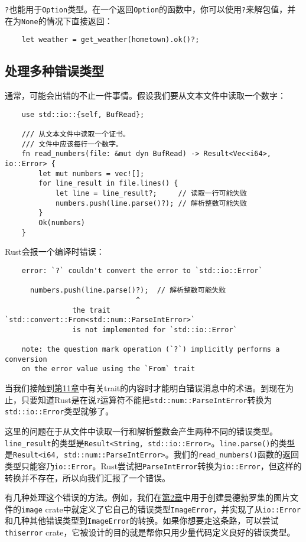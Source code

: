 \texttt{?}也能用于\texttt{Option}类型。在一个返回\texttt{Option}的函数中，你可以使用\texttt{?}来解包值，并在为\texttt{None}的情况下直接返回：
\begin{verbatim}
    let weather = get_weather(hometown).ok()?;
\end{verbatim}

\subsection{处理多种错误类型}
通常，可能会出错的不止一件事情。假设我们要从文本文件中读取一个数字：
\begin{verbatim}
    use std::io::{self, BufRead};

    /// 从文本文件中读取一个证书。
    /// 文件中应该每行一个数字。
    fn read_numbers(file: &mut dyn BufRead) -> Result<Vec<i64>, io::Error> {
        let mut numbers = vec![];
        for line_result in file.lines() {
            let line = line_result?;     // 读取一行可能失败
            numbers.push(line.parse()?); // 解析整数可能失败
        }
        Ok(numbers)
    }
\end{verbatim}

Rust会报一个编译时错误：
\begin{verbatim}
    error: `?` couldn't convert the error to `std::io::Error`

      numbers.push(line.parse()?);  // 解析整数可能失败
                               ^
                the trait `std::convert::From<std::num::ParseIntError>`
                is not implemented for `std::io::Error`

    note: the question mark operation (`?`) implicitly performs a conversion
    on the error value using the `From` trait
\end{verbatim}

当我们接触到\hyperref[ch11]{第11章}中有关trait的内容时才能明白错误消息中的术语。到现在为止，只要知道Rust是在说\texttt{?}运算符不能把\texttt{std::num::ParseIntError}转换为\texttt{std::io::Error}类型就够了。

这里的问题在于从文件中读取一行和解析整数会产生两种不同的错误类型。\texttt{line\_result}的类型是\texttt{Result<String, std::io::Error>}。\texttt{line.parse()}的类型是\texttt{Result<i64, std::num::ParseIntError>}。我们的\texttt{read\_numbers()}函数的返回类型只能容乃\texttt{io::Error}。Rust尝试把\texttt{ParseIntError}转换为\texttt{io::Error}，但这样的转换并不存在，所以向我们汇报了一个错误。

有几种处理这个错误的方法。例如，我们在\hyperref[ch02]{第2章}中用于创建曼德勃罗集的图片文件的\texttt{image} crate中就定义了它自己的错误类型\texttt{ImageError}，并实现了从\texttt{io::Error}和几种其他错误类型到\texttt{ImageError}的转换。如果你想要走这条路，可以尝试\texttt{thiserror} crate，它被设计的目的就是帮你只用少量代码定义良好的错误类型。

